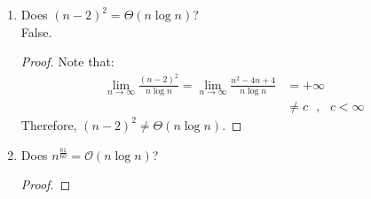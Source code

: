 \documentclass[11pt]{article}
\begin{document}
\begin{enumerate}
\begin{enumerate}
\begin{proof}
\begin{align*}
\end{align*}
Because this limit is a constant, $n \log_5{n} = \Theta(n \ln{n})$
\end{proof}
\newpage
\item Does $(n-2)^2 = \Theta(n \log n)$?
\\
False.
\begin{proof}
Note that:
\begin{align*}
\lim_{n \to \infty}\frac{(n-2)^2}{n \log{n}} = \lim_{n \to \infty} \frac{n^2-4n+4}{n \log{n}} &= + \infty 
\\&\neq c \textrm{  },\textrm{  } c < \infty
\end{align*}
Therefore, $(n-2)^2 \neq \Theta(n \log{n})$.
\end{proof}
\item Does $n^{\frac{61}{60}}= \mathcal{O}(n \log{n})$?
\\
\begin{proof}

\end{proof}
\end{enumerate}
\end{enumerate}
\end{document}
